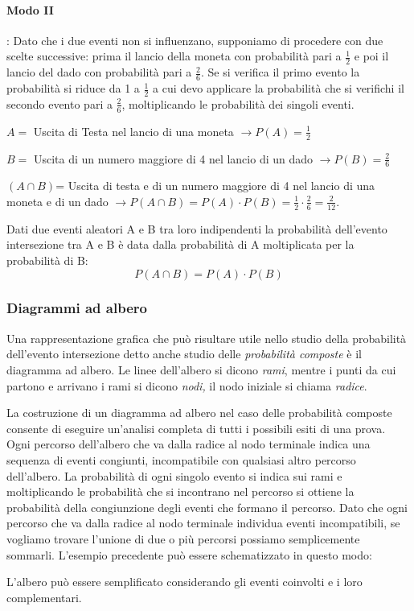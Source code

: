 \begin{esempio}
\paragraph{Modo II}: Dato che i due eventi non si influenzano, supponiamo di 
procedere con due scelte successive: prima il lancio della moneta con 
probabilità pari a $\frac 1 2$ e poi il lancio del dado con probabilità pari a 
$\frac 2 6$. Se si verifica il primo evento la probabilità si riduce da 1 a 
$\frac 1 2$ a cui devo applicare la probabilità che si verifichi il secondo 
evento pari a $\frac 2 6$, moltiplicando le probabilità dei singoli eventi.
\begin{itemize*}
\item $ A = $ Uscita di Testa nel lancio di una moneta $\to P(A)=\frac 1 2$
\item $ B = $ Uscita di un numero maggiore di 4 nel lancio di un dado $\to 
P(B)=\frac 2 6$
\item $(A\cap B)$= Uscita di testa e di un numero maggiore di 4 nel lancio di 
una moneta e di un dado $\to P(A\cap B)=P(A)\cdot P(B)=\frac 1 2\cdot \frac 2 
6=\frac 2{12}$.
\end{itemize*}
\end{esempio}

\begin{teorema}
Dati due eventi aleatori A e B tra loro indipendenti la 
probabilità dell'evento intersezione tra A e B è data dalla probabilità di A 
moltiplicata per la probabilità di B: \[P(A\cap B)=P(A)\cdot P(B)\]
\end{teorema}

\subsubsection*{Diagrammi ad albero}
Una rappresentazione grafica che può risultare utile nello studio della 
probabilità dell'evento intersezione detto anche studio delle \emph{probabilità 
composte} è il diagramma ad albero. Le linee dell'albero si dicono \emph{rami}, 
mentre i punti da cui partono e arrivano i rami si dicono \emph{nodi,} il nodo 
iniziale si chiama \emph{radice}.

La costruzione di un diagramma ad albero nel caso delle probabilità composte 
consente di eseguire un'analisi completa di tutti i possibili esiti di una 
prova. Ogni percorso dell'albero che va dalla radice al nodo terminale indica 
una sequenza di eventi congiunti, incompatibile con qualsiasi altro percorso 
dell'albero. La probabilità di ogni singolo evento si indica sui rami e 
moltiplicando le probabilità che si incontrano nel percorso si ottiene la 
probabilità della congiunzione degli eventi che formano il percorso. Dato che 
ogni percorso che va dalla radice al nodo terminale individua eventi 
incompatibili, se vogliamo trovare l'unione di due o più percorsi possiamo 
semplicemente sommarli.
L'esempio precedente può essere schematizzato in questo modo:
\begin{center}
 
\end{center}
L'albero può essere semplificato considerando gli eventi coinvolti e i loro 
complementari.

